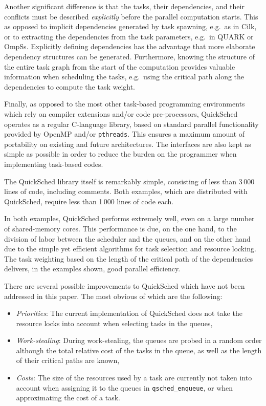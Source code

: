 \documentclass[preprint]{elsarticle}
\begin{document}
Another significant difference is that the tasks, their
dependencies, and their conflicts must be described
{\em explicitly} before the parallel computation starts.
This as opposed to implicit dependencies generated
by task spawning, e.g.~as in Cilk, or to extracting the
dependencies from the task parameters, e.g.~in QUARK or OmpSs.
Explicitly defining dependencies has the advantage that 
more elaborate dependency structures can be generated.
Furthermore, knowing the structure of the entire task
graph from the start of the computation provides valuable
information when scheduling the tasks, e.g.~using the 
critical path along the dependencies to compute the
task weight.

Finally, as opposed to the most other task-based
programming environments which rely on compiler extensions
and/or code pre-processors, QuickSched operates as a regular
C-language library, based on standard parallel functionality
provided by OpenMP and/or {\tt pthreads}.
This ensures a maximum amount of portability on existing
and future architectures.
The interfaces are also kept as simple
as possible in order to reduce the burden on the programmer
when implementing task-based codes.

The QuickSched library itself is remarkably simple, consisting of
less than 3\,000 lines of code, including comments.
Both examples, which are distributed with QuickSched,
require less than 1\,000 lines of code each.

In both examples, QuickSched performs extremely well, even
on a large number of shared-memory cores.
This performance is due, on the one hand, to the
division of labor between the scheduler and the queues,
and on the other hand due to the simple yet efficient
algorithms for task selection and resource locking.
The task weighting based on the length of the critical
path of the dependencies delivers, in the examples shown,
good parallel efficiency.

There are several possible improvements to QuickSched which
have not been addressed in this paper.
The most obvious of which are the following:
\begin{itemize}
    \item {\em Priorities}: The current implementation of
        QuickSched does not take the resource locks into
        account when selecting tasks in the queues,
    \item {\em Work-stealing}: During work-stealing, the
        queues are probed in a random order although
        the total relative cost of the tasks in the queue,
        as well as the length of their critical paths are
        known,
    \item {\em Costs}: The size of the resources used by
        a task are currently not taken into account when
        assigning it to the queues in {\tt qsched\_enqueue},
        or when approximating the cost of a task.
\end{itemize}
\end{document}
